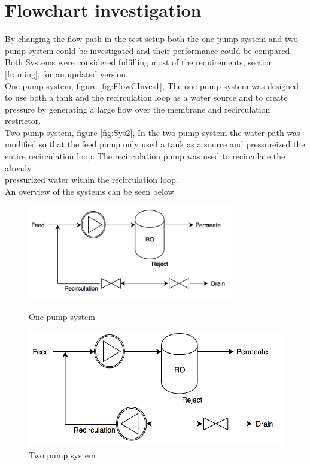\section{Flowchart investigation}
By changing the flow path in the test setup both the one pump system and two pump system could be investigated and their performance could be compared. Both Systems were considered fulfilling most of the requirements, section \ref{framing}, for an updated version. \\

One pump system, figure \ref{fig:FlowCInves1}, The one pump system was designed to use both a tank and the recirculation loop as a water source and to create pressure by generating a large flow over the membrane and recirculation restrictor. \\


Two pump system, figure \ref{fig:Sys2}, In the two pump system the water path was modified so that the feed pump only used a tank as a source and pressureized the entire recirculation loop. The recirculation pump was used to recirculate the already\\ pressurized water within the recirculation loop.\\


An overview of the systems can be seen below.\\
\begin{figure}[h]
\centering
\begin{minipage}{.5\textwidth}
    \centering
    \includegraphics[width=0.8\textwidth]{Sys1}
    \caption{One pump system}
    \label{fig:System1}
\end{minipage}%
\begin{minipage}{.5\textwidth}
  \centering
  \includegraphics[width=.8\linewidth]{Sys2}
  \caption{Two pump system}
  \label{fig:System2}
\end{minipage}
\end{figure}

